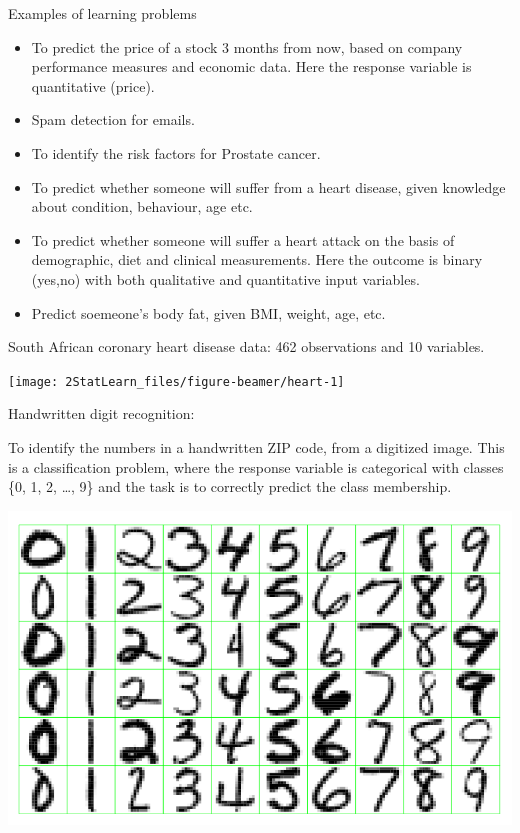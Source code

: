 \documentclass[ignorenonframetext,]{beamer}
\begin{document}
\begin{frame}{Examples of learning problems}

\begin{itemize}
\item
  To predict the price of a stock 3 months from now, based on company
  performance measures and economic data. Here the response variable is
  quantitative (price).
\item
  Spam detection for emails.
\item
  To identify the risk factors for Prostate cancer.
\item
  To predict whether someone will suffer from a heart disease, given
  knowledge about condition, behaviour, age etc.
\item
  To predict whether someone will suffer a heart attack on the basis of
  demographic, diet and clinical measurements. Here the outcome is
  binary ({yes},{no}) with both qualitative and quantitative input
  variables.
\item
  Predict soemeone's body fat, given BMI, weight, age, etc.
\end{itemize}

\end{frame}

\begin{frame}

South African coronary heart disease data: 462 observations and 10
variables.

\begin{center}\texttt{[image: 2StatLearn\_files/figure-beamer/heart-1]} \end{center}

\end{frame}

\begin{frame}

\begin{block}{Handwritten digit recognition:}

To identify the numbers in a handwritten ZIP code, from a digitized
image. This is a classification problem, where the response variable is
categorical with classes \{0, 1, 2, \ldots{}, 9\} and the task is to
correctly predict the class membership.

\includegraphics{digits.png}

\end{block}

\end{frame}
\end{document}
